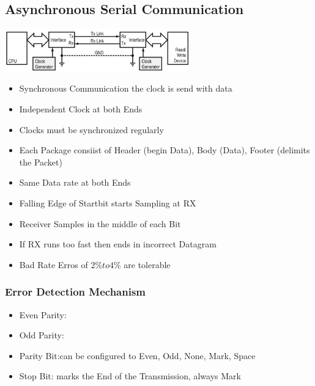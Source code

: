 \subsection{Asynchronous Serial Communication}
\includegraphics[width=8cm]{images/asyn.png}
\begin{itemize}
	\item Synchronous Communication the clock is send with data
	\item Independent Clock at both Ends	
	\item Clocks must be synchronized regularly
	\item Each Package consiist of Header (begin Data), Body (Data), Footer (delimits the Packet)
	\item Same Data rate at both Ends
	\item Falling Edge of Startbit starts Sampling at RX
	\item Receiver Samples in the middle of each Bit
	\item If RX runs too fast then ends in incorrect Datagram
	\item Bad Rate Erros of $2\% to 4\%$ are tolerable
\end{itemize}
\subsubsection{Error Detection Mechanism}
\begin{itemize}
	\item Even Parity:
	\item Odd Parity:
	\item Parity Bit:can be configured to Even, Odd, None, Mark, Space
	\item Stop Bit: marks the End of the Transmission, always Mark
\end{itemize}
